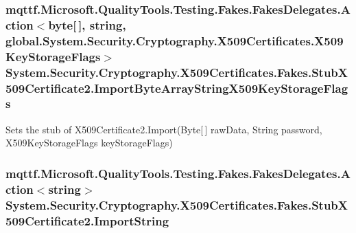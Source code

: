 \hypertarget{class_system_1_1_security_1_1_cryptography_1_1_x509_certificates_1_1_fakes_1_1_stub_x509_certificate2_a5ee1aa30ccc1ba60b12442ef36efec17}{
\subsubsection[{Import\-Byte\-Array\-String\-X509\-Key\-Storage\-Flags}]{\setlength{\rightskip}{0pt plus 5cm}mqttf.\-Microsoft.\-Quality\-Tools.\-Testing.\-Fakes.\-Fakes\-Delegates.\-Action$<$byte\mbox{[}$\,$\mbox{]}, string, global.\-System.\-Security.\-Cryptography.\-X509\-Certificates.\-X509\-Key\-Storage\-Flags$>$ System.\-Security.\-Cryptography.\-X509\-Certificates.\-Fakes.\-Stub\-X509\-Certificate2.\-Import\-Byte\-Array\-String\-X509\-Key\-Storage\-Flags}}\label{class_system_1_1_security_1_1_cryptography_1_1_x509_certificates_1_1_fakes_1_1_stub_x509_certificate2_a5ee1aa30ccc1ba60b12442ef36efec17}


Sets the stub of X509\-Certificate2.\-Import(\-Byte\mbox{[}$\,$\mbox{]} raw\-Data, String password, X509\-Key\-Storage\-Flags key\-Storage\-Flags)

\hypertarget{class_system_1_1_security_1_1_cryptography_1_1_x509_certificates_1_1_fakes_1_1_stub_x509_certificate2_aaf54439a2e5d31d5d2eff29b67d1009b}{
\subsubsection[{Import\-String}]{\setlength{\rightskip}{0pt plus 5cm}mqttf.\-Microsoft.\-Quality\-Tools.\-Testing.\-Fakes.\-Fakes\-Delegates.\-Action$<$string$>$ System.\-Security.\-Cryptography.\-X509\-Certificates.\-Fakes.\-Stub\-X509\-Certificate2.\-Import\-String}}\label{class_system_1_1_security_1_1_cryptography_1_1_x509_certificates_1_1_fakes_1_1_stub_x509_certificate2_aaf54439a2e5d31d5d2eff29b67d1009b}


